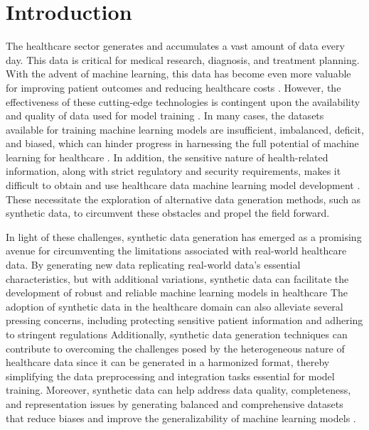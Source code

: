 \documentclass{article}
\begin{document}
\section{Introduction}
The healthcare sector generates and accumulates a vast amount of data every day. This data is critical for medical research, diagnosis, and treatment planning. With the advent of machine learning, this data has become even more valuable for improving patient outcomes and reducing healthcare costs \cite{obermeyer2016predicting}. However, the effectiveness of these cutting-edge technologies is contingent upon the availability and quality of data used for model training \cite{rajkomar2019machine}. In many cases, the datasets available for training machine learning models are insufficient, imbalanced, deficit, and biased, which can hinder progress in harnessing the full potential of machine learning for healthcare \cite{johnson2016machine,dash2019big}. In addition, the sensitive nature of health-related information, along with strict regulatory and security requirements, makes it difficult to obtain and use healthcare data machine learning model development \cite{winter2019governance}. These necessitate the exploration of alternative data generation methods, such as synthetic data, to circumvent these obstacles and propel the field forward.

\par In light of these challenges, synthetic data generation has emerged as a promising avenue for circumventing the limitations associated with real-world healthcare data. By generating new data replicating real-world data's essential characteristics, but with additional variations, synthetic data can facilitate the development of robust and reliable machine learning models in healthcare \cite{chen2021synthetic,murtaza2023synthetic} The adoption of synthetic data in the healthcare domain can also alleviate several pressing concerns, including protecting sensitive patient information and adhering to stringent regulations \cite{gonzales2023synthetic} Additionally, synthetic data generation techniques can contribute to overcoming the challenges posed by the heterogeneous nature of healthcare data since it can be generated in a harmonized format, thereby simplifying the data preprocessing and integration tasks essential for model training. Moreover, synthetic data can help address data quality, completeness, and representation issues by generating balanced and comprehensive datasets that reduce biases and improve the generalizability of machine learning models \cite{das2022conditional}.
\end{document}
